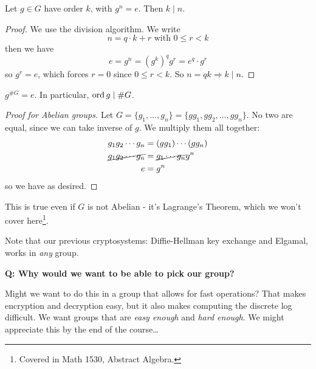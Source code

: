 \begin{proposition}
    Let $g\in G$ have order $k$, with $g^n = e$. Then $k\mid n$.
\end{proposition}
\begin{proof}
    We use the division algorithm. We write
    \[n = q\cdot k + r\text{ with }0\leq r < k\]
    then we have
    \[e = g^n = (g^k)^q g^r = e^q\cdot g^r\]
    so $g^r = e$, which forces $r = 0$ since $0\leq r < k$. So $n = qk \Rightarrow k\mid n$.
\end{proof}
\begin{theorem}
    $g^{\#G} = e$. In particular, $\operatorname{ord} g\mid \#G$.
\end{theorem}
\begin{proof}[Proof for Abelian groups]
    Let $G = \{g_1, \dots, g_n\} = \{gg_1, gg_2, \dots, gg_n\}$. No two are equal, since we can take inverse of $g$. We multiply them all together:
    \begin{align*}
        g_1g_2\cdots g_n          & = (gg_1)\cdots (gg_n)        \\
        \cancel{g_1g_2\cdots g_n} & = \cancel{g_1\cdots g_n} g^n \\
        e                         & = g^n
    \end{align*}
    so we have as desired.
\end{proof}
This is true even if $G$ is not Abelian - it's Lagrange's Theorem, which we won't cover here\footnote{Covered in Math 1530, Abstract Algebra.}.

Note that our previous cryptosystems: Diffie-Hellman key exchange and Elgamal, works in \emph{any} group.

\textbf{Q: Why would we want to be able to pick our group?}

Might we want to do this in a group that allows for fast operations? That makes encryption and decryption easy, but it also makes computing the discrete log difficult. We want groups that are \emph{easy enough} and \emph{hard enough}. We might appreciate this by the end of the course\dots

